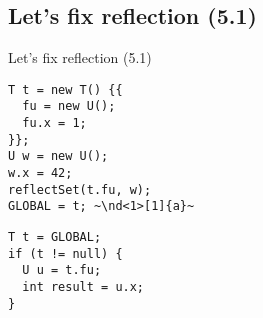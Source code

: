 %
\ifrender
\subsection{Let's fix reflection (5.1)}
\begin{frame}[fragile]{Let's fix reflection (5.1)}
%
\begin{minipage}{0.5\textwidth}
	\begin{lstlisting}
T t = new T() {{
  fu = new U();
  fu.x = 1;
}};
U w = new U();
w.x = 42;
reflectSet(t.fu, w);
GLOBAL = t; ~\nd<1>[1]{a}~
	\end{lstlisting}
\end{minipage}%
\begin{minipage}{0.5\textwidth}
	\begin{lstlisting}[title=Thread 2]
T t = GLOBAL;
if (t != null) {
  U u = t.fu;
  int result = u.x;
}
	\end{lstlisting}
\end{minipage}

\begin{center}
%
\end{center}
\end{frame}
\fi
